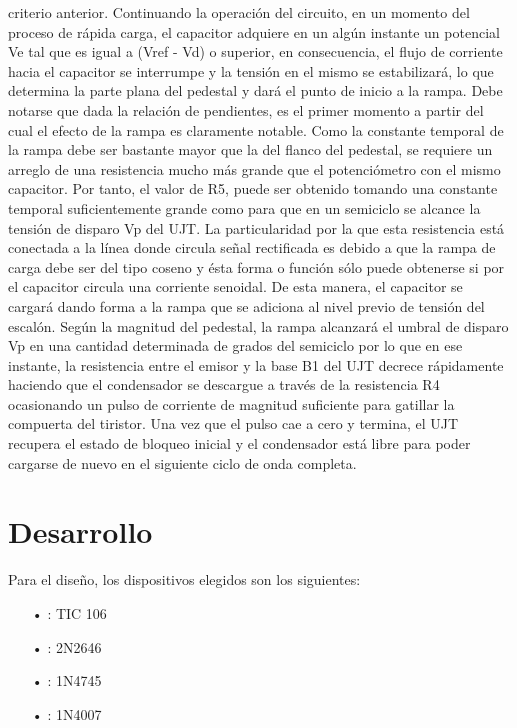\documentclass{article}
\begin{document}
criterio anterior.  Continuando la operación del circuito, en un momento del proceso de rápida carga, el              capacitor adquiere en un algún instante un potencial Ve tal que es igual a (Vref - Vd) o superior,                   en consecuencia, el flujo de corriente hacia el capacitor se interrumpe y la tensión en el mismo                 se estabilizará, lo que determina la parte plana del pedestal y dará el punto de inicio a la rampa.                   Debe notarse que dada la relación de pendientes, es el primer momento a partir del cual el                 efecto de la rampa es claramente notable. Como la constante temporal de la rampa debe ser                bastante mayor que la del flanco del pedestal, se requiere un arreglo de una resistencia mucho                más grande que el potenciómetro con el mismo capacitor. Por tanto, el valor de R5, puede ser                 obtenido tomando una constante temporal suficientemente grande como para que en un            semiciclo se alcance la tensión de disparo Vp del UJT. La particularidad por la que esta                resistencia está conectada a la línea donde circula señal rectificada es debido a que la rampa                de carga debe ser del tipo coseno y ésta forma o función sólo puede obtenerse si por el                  capacitor circula una corriente senoidal. De esta manera, el capacitor se cargará dando forma a la rampa que se adiciona al nivel                 previo de tensión del escalón. Según la magnitud del pedestal, la rampa alcanzará el umbral de                disparo Vp en una cantidad determinada de grados del semiciclo por lo que en ese instante, la resistencia entre el emisor y la base B1 del UJT decrece rápidamente haciendo que el               condensador se descargue a través de la resistencia R4 ocasionando un pulso de corriente de               magnitud suficiente para gatillar la compuerta del tiristor. Una vez que el pulso cae a cero y termina, el UJT recupera el estado de bloqueo inicial y el                    condensador está libre para poder cargarse de nuevo en el siguiente ciclo de onda completa. 
%
\section{Desarrollo}
Para el diseño, los dispositivos elegidos son los siguientes:
\begin{itemize}\itemsep0em \itemindent=2em
	\item[•]{: TIC 106}
	\item[•]{: 2N2646}
	\item[•]{: 1N4745}
	\item[•]{: 1N4007}
\end{itemize}
%
\end{document}
